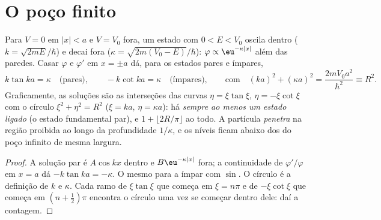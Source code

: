 \section{O poço finito}

\begin{proposition}\label{prop:b2:potential-wells-tunneling:finite}
Para $V = 0$ em $|x| < a$ e $V = V_0$ fora, um estado com $0 < E < V_0$
oscila dentro ($k = \sqrt{2mE}/\hbar$) e decai fora ($\kappa =
\sqrt{2m(V_0 - E)}/\hbar$): $\varphi \propto \eu^{-\kappa|x|}$ além das paredes.
Casar $\varphi$ e $\varphi'$ em $x = \pm a$ dá, para os estados pares e
ímpares,
\[
k\tan ka = \kappa \quad\text{(pares)}, \qquad
-k\cot ka = \kappa \quad\text{(ímpares)}, \qquad\text{com}\quad
(ka)^2 + (\kappa a)^2 = \frac{2mV_0a^2}{\hbar^2} \equiv R^2 .
\]
Graficamente, as soluções são as interseções das curvas $\eta =
\xi\tan\xi$, $\eta = -\xi\cot\xi$ com o círculo $\xi^2 + \eta^2 = R^2$
($\xi = ka$, $\eta = \kappa a$): há \emph{sempre ao menos um estado
ligado} (o estado fundamental par), e $1 + \lfloor 2R/\pi\rfloor$ ao todo.
A partícula \emph{penetra} na região proibida ao longo da profundidade
$1/\kappa$, e os níveis ficam abaixo dos do poço infinito de
mesma largura.
\end{proposition}

\begin{proof}
A solução par é $A\cos kx$ dentro e $B\eu^{-\kappa|x|}$ fora; a
continuidade de $\varphi'/\varphi$ em $x = a$ dá $-k\tan ka = -\kappa$. O mesmo
para a ímpar com $\sin$. O círculo é a definição de $k$ e
$\kappa$. Cada ramo de $\xi\tan\xi$ que começa em $\xi = n\pi$ e de
$-\xi\cot\xi$ que começa em $(n + \tfrac12)\pi$ encontra o círculo uma vez se
começar dentro dele: daí a contagem.
\end{proof}

